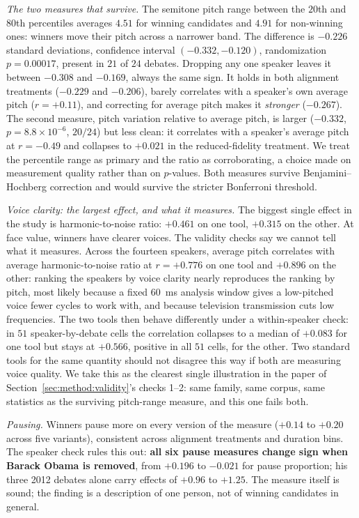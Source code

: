 \documentclass[journal]{IEEEtran}
\begin{document}
\emph{The two measures that survive.} The semitone pitch range between the
$20$th and $80$th percentiles averages $4.51$ for winning candidates and
$4.91$ for non-winning ones: winners move their pitch across a narrower
band. The difference is $-0.226$ standard deviations, confidence interval
$(-0.332, -0.120)$, randomization $p = 0.00017$, present in $21$ of $24$
debates. Dropping any one speaker leaves it between $-0.308$ and
$-0.169$, always the same sign. It holds in both alignment treatments
($-0.229$ and $-0.206$), barely correlates with a speaker's own average
pitch ($r = +0.11$), and correcting for average pitch makes it
\emph{stronger} ($-0.267$). The second measure, pitch variation relative to
average pitch, is larger ($-0.332$, $p = 8.8\times10^{-6}$, $20/24$) but
less clean: it correlates with a speaker's average pitch at $r = -0.49$ and
collapses to $+0.021$ in the reduced-fidelity treatment. We treat the
percentile range as primary and the ratio as corroborating, a choice made on
measurement quality rather than on $p$-values. Both measures survive
Benjamini--Hochberg correction and would survive the stricter Bonferroni
threshold.

\emph{Voice clarity: the largest effect, and what it measures.} The biggest
single effect in the study is harmonic-to-noise ratio: $+0.461$ on one tool,
$+0.315$ on the other. At face value, winners have clearer voices. The
validity checks say we cannot tell what it measures. Across the fourteen
speakers, average pitch correlates with average harmonic-to-noise ratio at
$r = +0.776$ on one tool and $+0.896$ on the other: ranking the speakers by
voice clarity nearly reproduces the ranking by pitch, most likely because a
fixed $60$~ms analysis window gives a low-pitched voice fewer cycles to work
with, and because television transmission cuts low frequencies. The two
tools then behave differently under a within-speaker check: in $51$
speaker-by-debate cells the correlation collapses to a median of $+0.083$
for one tool but stays at $+0.566$, positive in all $51$ cells, for the
other. Two standard tools for the same quantity should not disagree this
way if both are measuring voice quality. We take this as the clearest single
illustration in the paper of Section~\ref{sec:method:validity}'s checks
1--2: same family, same corpus, same statistics as the surviving
pitch-range measure, and this one fails both.

\emph{Pausing.} Winners pause more on every version of the measure ($+0.14$
to $+0.20$ across five variants), consistent across alignment treatments and
duration bins. The speaker check rules this out: \textbf{all six pause
measures change sign when Barack Obama is removed}, from $+0.196$ to
$-0.021$ for pause proportion; his three 2012 debates alone carry effects of
$+0.96$ to $+1.25$. The measure itself is sound; the finding is a
description of one person, not of winning candidates in general.
\end{document}
